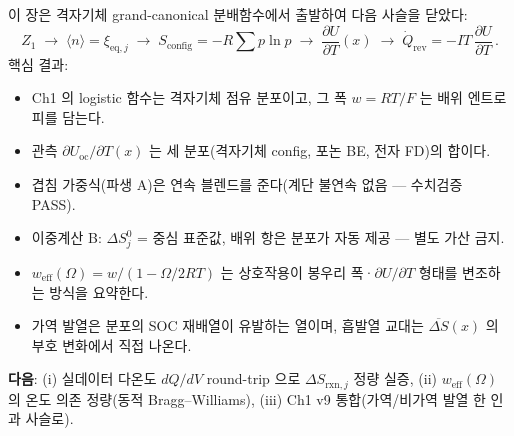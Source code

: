 \documentclass[11pt,a4paper]{article}
\newcommand{\rxn}{\mathrm{rxn}}
\newcommand{\eq}{\mathrm{eq}}
\newcommand{\rev}{\mathrm{rev}}
\newcommand{\oc}{\mathrm{oc}}
\newcommand{\config}{\mathrm{config}}
\newcommand{\eff}{\mathrm{eff}}
\begin{document}
이 장은 격자기체 grand-canonical 분배함수에서 출발하여 다음 사슬을 닫았다:
\[
  Z_1 \;\to\; \langle n\rangle=\xi_{\eq,j}
  \;\to\; S_\config=-R\sum p\ln p
  \;\to\; \frac{\partial U}{\partial T}(x)
  \;\to\; \dot Q_\rev=-IT\,\frac{\partial U}{\partial T}\,.
\]
핵심 결과:
\begin{itemize}[leftmargin=1.4em,itemsep=2pt]
\item Ch1 의 logistic 함수는 격자기체 점유 분포이고, 그 폭 $w=RT/F$ 는 배위 엔트로피를 담는다.
\item 관측 $\partial U_\oc/\partial T(x)$ 는 세 분포(격자기체 config, 포논 BE, 전자 FD)의 합이다.
\item 겹침 가중식(파생 A)은 연속 블렌드를 준다(계단 불연속 없음 --- 수치검증~\cite{verif42} PASS).
\item 이중계산 B: $\Delta S^0_j$ = 중심 표준값, 배위 항은 분포가 자동 제공 --- 별도 가산 금지.
\item $w_\eff(\Omega)=w/(1-\Omega/2RT)$ 는 상호작용이 봉우리 폭·$\partial U/\partial T$ 형태를 변조하는 방식을 요약한다.
\item 가역 발열은 분포의 SOC 재배열이 유발하는 열이며, 흡발열 교대는 $\overline{\Delta S}(x)$
  의 부호 변화에서 직접 나온다.
\end{itemize}

\textbf{다음}: (i) 실데이터 다온도 $dQ/dV$ round-trip 으로 $\Delta S_{\rxn,j}$ 정량 실증,
(ii) $w_\eff(\Omega)$ 의 온도 의존 정량(동적 Bragg--Williams),
(iii) Ch1 v9 통합(가역/비가역 발열 한 인과 사슬로).
\end{document}
